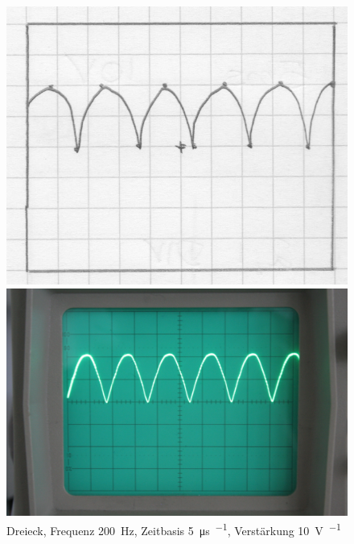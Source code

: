 \begin{figure}[htbp]
	\centering
	\begin{minipage}{.45\linewidth}
	\includegraphics[width=\linewidth]{Oszi_Hand/796.jpg}
	\end{minipage}
	\hfill
	\begin{minipage}{.45\linewidth}
	\includegraphics[width=\linewidth]{Oszi_Foto/796.jpg}
	\end{minipage}
	\caption{%
		Dreieck, Frequenz \SI{200}{\hertz},
		Zeitbasis \SI{5}{\micro\second\per\division},
		Verstärkung \SI{10}{\volt\per\division}
	}
	\label{fig:796}
\end{figure}

